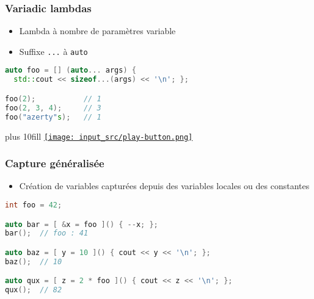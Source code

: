 \documentclass[C++.tex]{subfiles}
\begin{document}
\begin{frame}[fragile]
	\frametitle{Variadic lambdas}
	\begin{itemize}
		\item Lambda à nombre de paramètres variable
		\item Suffixe \lstinline|...| à \lstinline|auto|
	\end{itemize}

	\begin{lstlisting}[language=C++]
auto foo = [] (auto... args) { 
  std::cout << sizeof...(args) << '\n'; };

foo(2);           // 1
foo(2, 3, 4);     // 3
foo("azerty"s);   // 1\end{lstlisting}

	\vskip 10mm plus 10fill
	\hfill
	\href{https://godbolt.org/#g:!((g:!((g:!((h:codeEditor,i:(filename:'1',fontScale:14,fontUsePx:'0',j:1,lang:c%2B%2B,selection:(endColumn:1,endLineNumber:13,positionColumn:1,positionLineNumber:13,selectionStartColumn:1,selectionStartLineNumber:8,startColumn:1,startLineNumber:8),source:'%23include+%3Ciostream%3E%0A%23include+%3Cstring%3E%0A%0Ausing+namespace+std::literals%3B%0A%0Aint+main()%0A%7B%0A++auto+foo+%3D+%5B%5D+(auto...+args)+%7B+std::cout+%3C%3C+sizeof...(args)+%3C%3C+!'%5Cn!'%3B+%7D%3B%0A%0A++foo(2)%3B%0A++foo(2,+3,+4)%3B%0A++foo(%22azerty%22s)%3B%0A%7D%0A'),l:'5',n:'0',o:'C%2B%2B+source+%231',t:'0')),k:50,l:'4',n:'0',o:'',s:0,t:'0'),(g:!((h:executor,i:(argsPanelShown:'1',compilationPanelShown:'0',compiler:g122,compilerName:'',compilerOutShown:'0',execArgs:'',execStdin:'',fontScale:14,fontUsePx:'0',j:1,lang:c%2B%2B,libs:!((name:boost,ver:'175')),options:'-std%3Dc%2B%2B14+-Wall+-Wextra',source:1,stdinPanelShown:'1',tree:'1',wrap:'0'),l:'5',n:'0',o:'Executor+x86-64+gcc+12.2+(C%2B%2B,+Editor+%231)',t:'0')),header:(),k:50,l:'4',n:'0',o:'',s:0,t:'0')),l:'2',n:'0',o:'',t:'0')),version:4}{\texttt{[image: input\_src/play-button.png]}}
\end{frame}

\begin{frame}[fragile]
	\frametitle{Capture généralisée}
	\begin{itemize}
		\item Création de variables capturées depuis des variables locales ou des constantes
	\end{itemize}

	\begin{lstlisting}[language=C++]
int foo = 42;

auto bar = [ &x = foo ]() { --x; };
bar();  // foo : 41

auto baz = [ y = 10 ]() { cout << y << '\n'; };
baz();  // 10

auto qux = [ z = 2 * foo ]() { cout << z << '\n'; };
qux();  // 82\end{lstlisting}
\end{frame}
\end{document}
